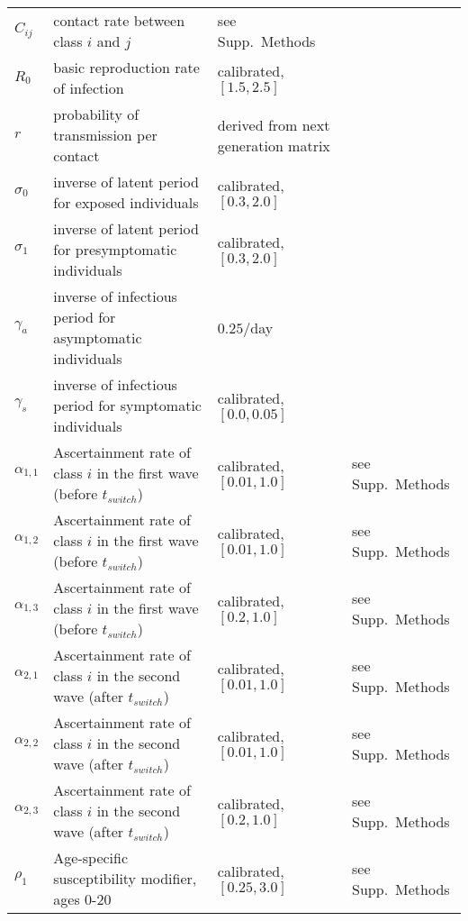 \documentclass[10pt,onecolumn,twoside,lineno]{pnas-new}
\begin{document}
\begin{table}[H]
\begin{tabular}{llll}
$C_{ij}$    & contact rate between class $i$ and $j$    & see Supp.~Methods & \cite{prem2020projecting} \\
$R_0$ & basic reproduction rate of infection & calibrated, $[1.5,2.5]$ & \cite{hilton2020estimation,googlemobility, ontariocoviddata}  \\
$r$         & probability of transmission per contact   & derived from next generation matrix & \cite{diekmann2010construction} \\
$\sigma_0$    & inverse of latent period for exposed individuals                  & calibrated, $[0.3,2.0]$ & \cite{googlemobility, ontariocoviddata,nishiura2020serial,lauer2020incubation,tindale2020transmission} \\
$\sigma_1$    & inverse of latent period for presymptomatic individuals & calibrated, $[0.3,2.0]$ & \cite{googlemobility, ontariocoviddata,nishiura2020serial,lauer2020incubation,tindale2020transmission} \\
$\gamma_a$    & inverse of infectious period for asymptomatic individuals & $0.25$/day &  \cite{nishiura2020serial,lauer2020incubation,tindale2020transmission} \\
$\gamma_s$    & inverse of infectious period for symptomatic individuals  & calibrated, $[0.0,0.05]$ & \cite{googlemobility, ontariocoviddata,nishiura2020serial,lauer2020incubation,tindale2020transmission} \\
$\alpha_{1,1}$ & Ascertainment rate of class $i$ in the first wave (before $t_{switch}$) & calibrated, $[0.01,1.0]$ & see Supp.~Methods\\
$\alpha_{1,2}$ & Ascertainment rate of class $i$  in the first wave (before $t_{switch}$) & calibrated, $[0.01,1.0]$ & see Supp.~Methods\\
$\alpha_{1,3}$ & Ascertainment rate of class $i$ in the first wave (before $t_{switch}$) & calibrated, $[0.2,1.0]$ & see Supp.~Methods\\
$\alpha_{2,1}$ & Ascertainment rate of class $i$  in the second wave (after $t_{switch}$)& calibrated, $[0.01,1.0]$ & see Supp.~Methods\\
$\alpha_{2,2}$ & Ascertainment rate of class $i$ in the second wave (after $t_{switch}$) & calibrated, $[0.01,1.0]$ & see Supp.~Methods\\
$\alpha_{2,3}$ & Ascertainment rate of class $i$  in the second wave (after $t_{switch}$)& calibrated, $[0.2,1.0]$ & see Supp.~Methods\\
$\rho_1$ & Age-specific susceptibility modifier, ages 0-20 & calibrated, $[0.25,3.0]$  & see Supp.~Methods\\

\end{tabular}
\end{table}
\end{document}
